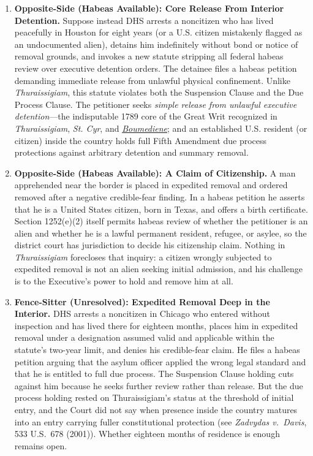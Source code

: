 \documentclass[12pt]{article}
\begin{document}
\begin{enumerate}
\item \textbf{Opposite-Side (Habeas Available): Core Release From Interior Detention.} Suppose instead DHS arrests a noncitizen who has lived peacefully in Houston for eight years (or a U.S. citizen mistakenly flagged as an undocumented alien), detains him indefinitely without bond or notice of removal grounds, and invokes a new statute stripping all federal habeas review over executive detention orders. The detainee files a habeas petition demanding immediate release from unlawful physical confinement. Unlike \textit{Thuraissigiam}, this statute violates both the Suspension Clause and the Due Process Clause. The petitioner seeks \textit{simple release from unlawful executive detention}---the indisputable 1789 core of the Great Writ recognized in \textit{Thuraissigiam}, \textit{St. Cyr}, and \href{https://supreme.justia.com/cases/federal/us/553/723/}{\textit{Boumediene}}; and an established U.S. resident (or citizen) inside the country holds full Fifth Amendment due process protections against arbitrary detention and summary removal.

\item \textbf{Opposite-Side (Habeas Available): A Claim of Citizenship.} A man apprehended near the border is placed in expedited removal and ordered removed after a negative credible-fear finding. In a habeas petition he asserts that he is a United States citizen, born in Texas, and offers a birth certificate. Section 1252(e)(2) itself permits habeas review of whether the petitioner is an alien and whether he is a lawful permanent resident, refugee, or asylee, so the district court has jurisdiction to decide his citizenship claim. Nothing in \textit{Thuraissigiam} forecloses that inquiry: a citizen wrongly subjected to expedited removal is not an alien seeking initial admission, and his challenge is to the Executive's power to hold and remove him at all.

\item \textbf{Fence-Sitter (Unresolved): Expedited Removal Deep in the Interior.} DHS arrests a noncitizen in Chicago who entered without inspection and has lived there for eighteen months, places him in expedited removal under a designation assumed valid and applicable within the statute's two-year limit, and denies his credible-fear claim. He files a habeas petition arguing that the asylum officer applied the wrong legal standard and that he is entitled to full due process. The Suspension Clause holding cuts against him because he seeks further review rather than release. But the due process holding rested on Thuraissigiam's status at the threshold of initial entry, and the Court did not say when presence inside the country matures into an entry carrying fuller constitutional protection (see \textit{Zadvydas v.\ Davis}, 533 U.S.\ 678 (2001)). Whether eighteen months of residence is enough remains open.

\end{enumerate}
\end{document}
